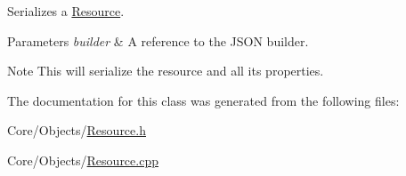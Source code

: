 Serializes a \hyperlink{classDCEngine_1_1Resource}{Resource}. 


\begin{DoxyParams}{Parameters}
{\em builder} & A reference to the J\-S\-O\-N builder. \\
\hline
\end{DoxyParams}
\begin{DoxyNote}{Note}
This will serialize the resource and all its properties. 
\end{DoxyNote}


The documentation for this class was generated from the following files\-:\begin{DoxyCompactItemize}
\item 
Core/\-Objects/\hyperlink{Resource_8h}{Resource.\-h}\item 
Core/\-Objects/\hyperlink{Resource_8cpp}{Resource.\-cpp}\end{DoxyCompactItemize}
